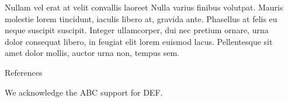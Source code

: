 \documentclass[final]{beamer}
\newlength{\sepwidth}
\newlength{\colwidth}
\newcommand{\separatorcolumn}{\begin{column}{\sepwidth}\end{column}}
\begin{document}
\begin{frame}[t]
\begin{columns}[t]
\begin{column}{\colwidth}
\begin{block}{Nullam vel erat at velit convallis laoreet}
    Nulla varius finibus volutpat. Mauris molestie lorem tincidunt, iaculis
    libero at, gravida ante. Phasellus at felis eu neque suscipit suscipit.
    Integer ullamcorper, dui nec pretium ornare, urna dolor consequat libero,
    in feugiat elit lorem euismod lacus. Pellentesque sit amet dolor mollis,
    auctor urna non, tempus sem.

  \end{block}

  \begin{block}{References}
    \nocite{*}
    \footnotesize{}
  \end{block}

  
  \vspace{-5mm}
  We acknowledge the ABC support for DEF.

\end{column}

\separatorcolumn
\end{columns}
\end{frame}
\end{document}
